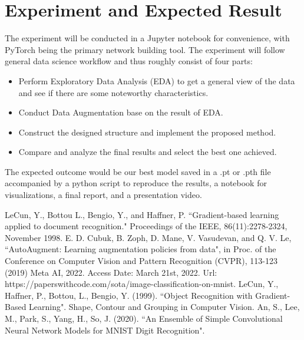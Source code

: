 \documentclass{article}
\begin{document}
\section{Experiment and Expected Result}
The experiment will be conducted in a Jupyter notebook for convenience, with PyTorch being the primary network building tool. The experiment will follow general data science workflow and thus roughly consist of four parts: 
\begin{itemize}[noitemsep]
    \item Perform Exploratory Data Analysis (EDA) to get a general view of the data and see if there are some noteworthy characteristics.
    \item Conduct Data Augmentation base on the result of EDA.
    \item Construct the designed structure and implement the proposed method.
    \item Compare and analyze the final results and select the best one achieved.
\end{itemize}
The expected outcome would be our best model saved in a .pt or .pth file accompanied by a python script to reproduce the results, a notebook for visualizations, a final report, and a presentation video.

\begin{thebibliography}{00}
LeCun, Y., Bottou L., Bengio, Y., and Haffner, P. ``Gradient-based learning applied to document recognition." Proceedings of the IEEE, 86(11):2278-2324, November 1998.
E. D. Cubuk, B. Zoph, D. Mane, V. Vasudevan, and Q. V. Le, ``AutoAugment: Learning augmentation policies
from data", in Proc. of the Conference on Computer Vision and Pattern Recognition (CVPR), 113-123 (2019)
 Meta AI, 2022. Access Date: March 21st, 2022. Url: https://paperswithcode.com/sota/image-classification-on-mnist.
LeCun, Y., Haffner, P., Bottou, L., Bengio, Y. (1999). ``Object Recognition with Gradient-Based Learning". Shape, Contour and Grouping in Computer Vision.
An, S., Lee, M., Park, S., Yang, H., So, J. (2020). ``An Ensemble of Simple Convolutional Neural Network Models for MNIST Digit Recognition". 
\end{thebibliography}
\end{document}
